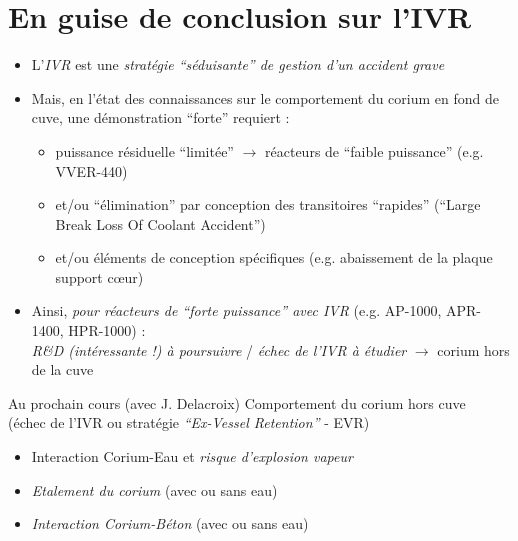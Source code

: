 \documentclass[usenames,dvipsnames]{beamer}
\renewcommand{\emph}[1]{\textcolor{cea8}{\textit{#1}}}
\begin{document}


\section*{En guise de conclusion sur l'IVR}
\begin{frame}[fragile]
\begin{itemize}
\item L'\emph{IVR} est une \emph{stratégie ``séduisante'' de gestion d'un accident grave}
\item Mais, en l'état des connaissances sur le comportement du corium en fond de cuve, une démonstration ``forte'' requiert :
\begin{itemize}
\item puissance résiduelle ``limitée'' $\rightarrow$ réacteurs de ``faible puissance'' (e.g. VVER-440) 
\item et/ou ``élimination'' par conception des transitoires ``rapides'' (``Large Break Loss Of Coolant Accident'')
\item et/ou éléments de conception spécifiques (e.g. abaissement de la plaque support c\oe ur)
\end{itemize}
\item Ainsi, \emph{pour réacteurs de ``forte puissance'' avec IVR} (e.g. AP-1000, APR-1400, HPR-1000) : \\ \emph{R\&D (intéressante !) à poursuivre} / 
\emph{échec de l'IVR à étudier} $\rightarrow$ corium hors de la cuve
\end{itemize}
\begin{ceaexample2block}{Au prochain cours (avec J. Delacroix)}
Comportement du corium hors cuve \\ (échec de l'IVR ou stratégie \emph{``Ex-Vessel Retention''} - EVR)
\begin{itemize}
  \item Interaction Corium-Eau et \emph{risque d'explosion vapeur}
  \item \emph{Etalement du corium} (avec ou sans eau)
  \item \emph{Interaction Corium-Béton} (avec ou sans eau)
\end{itemize}
\end{ceaexample2block}
\end{frame}
\end{document}

